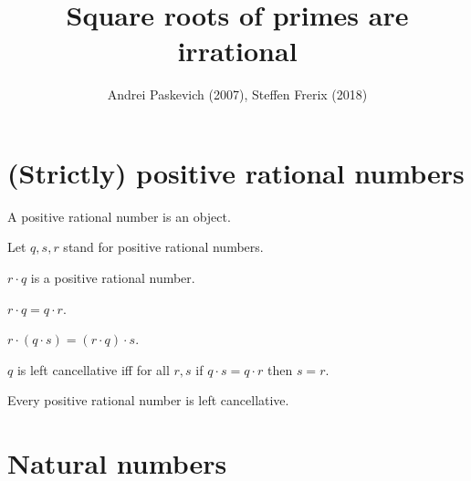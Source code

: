 \documentclass{article}
\title{Square roots of primes are irrational}
\author{Andrei Paskevich (2007), Steffen Frerix (2018)}
\date{}
\begin{document}
  \maketitle

  \begin{forthel}
  \end{forthel}


  \section*{(Strictly) positive rational numbers}

  \begin{forthel}
    \begin{signature}
      A positive rational number is an object.
    \end{signature}

    Let $q, s, r$ stand for positive rational numbers.

    \begin{signature}
      $r \cdot q$ is a positive rational number.
    \end{signature}

    \begin{axiom}
      $r \cdot q = q \cdot r$.
    \end{axiom}

    \begin{axiom}
      $r \cdot (q \cdot s) = (r \cdot q) \cdot s$.
    \end{axiom}

    \begin{definition}
      $q$ is left cancellative iff
      for all $r, s$ if $q\cdot s = q\cdot r$ then $s = r$.
    \end{definition}

    \begin{axiom}
      Every positive rational number is left cancellative.
    \end{axiom}
  \end{forthel}

  \section*{Natural numbers}
\end{document}
